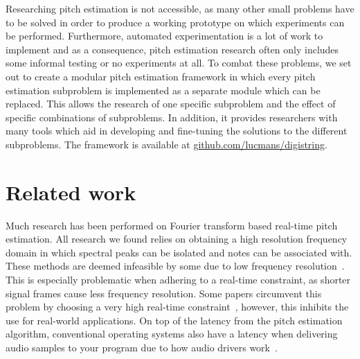 \documentclass[a4paper,10pt,twocolumn]{article}
\begin{document}
Researching pitch estimation is not accessible, as many other small problems have to be solved in order to produce a working prototype on which experiments can be performed. Furthermore, automated experimentation is a lot of work to implement and as a consequence, pitch estimation research often only includes some informal testing or no experiments at all. To combat these problems, we set out to create a modular pitch estimation framework in which every pitch estimation subproblem is implemented as a separate module which can be replaced. This allows the research of one specific subproblem and the effect of specific combinations of subproblems. In addition, it provides researchers with many tools which aid in developing and fine-tuning the solutions to the different subproblems. The framework is available at \url{github.com/lucmans/digistring}.




\section{Related work}  \label{sec:related}
Much research has been performed on Fourier transform based real-time pitch estimation. All research we found relies on obtaining a high resolution frequency domain in which spectral peaks can be isolated and notes can be associated with. These methods are deemed infeasible by some due to low frequency resolution~\cite{fourierlimit}. %
This is especially problematic when adhering to a real-time constraint, as shorter signal frames cause less frequency resolution. Some papers circumvent this problem by choosing a very high real-time constraint~\cite{sloomboi, sloomboi2}, however, this inhibits the use for real-world applications. On top of the latency from the pitch estimation algorithm, conventional operating systems also have a latency when delivering audio samples to your program due to how audio drivers work~\cite{oslatency}.
\end{document}
